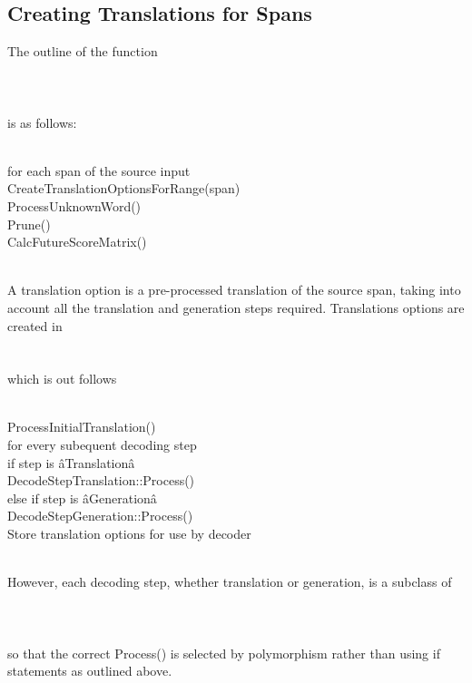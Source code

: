 \documentclass[11pt]{book}
\theoremstyle{plain}
\begin{document}
\subsection{Creating Translations for Spans}
The outline of the function \\
\\
\\
\\
is as follows:\\
\\
\begin{tt}
\indent	for each span of the source input\\
\indent \indent	CreateTranslationOptionsForRange(span)\\
\indent	ProcessUnknownWord()\\
\indent	Prune()\\
\indent	CalcFutureScoreMatrix()\\
\end{tt}
\\
A translation option is a pre-processed translation of the source span, taking into account all the translation and generation steps required. Translations options are created in\\
\\
\\
which is out follows\\
\\
\begin{tt}
\indent	ProcessInitialTranslation()\\
\indent	for every subequent decoding step\\
\indent \indent	if step is âTranslationâ\\
\indent \indent \indent	DecodeStepTranslation::Process()\\
\indent \indent else if step is âGenerationâ\\
\indent \indent \indent DecodeStepGeneration::Process()\\
\indent Store translation options for use by decoder\\
\end{tt}
\\
However, each decoding step, whether translation or generation, is a subclass of\\
\\
\\
\\
so that the correct Process() is selected by polymorphism rather than using if statements as outlined above.
\end{document}
